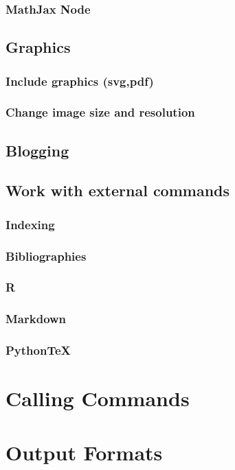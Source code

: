 \documentclass{book}
\begin{document}
\subsection{MathJax Node}


\section{Graphics}
\subsection{Include graphics (svg,pdf)}
\subsection{Change image size and resolution}

\section{Blogging}

\section{Work with external commands}
\subsection{Indexing}
\subsection{Bibliographies}
\subsection{R}
\subsection{Markdown}
\subsection{PythonTeX}


\chapter{Calling Commands}

\label{sec:calling-commands}
\chapter{Output Formats}
\end{document}
